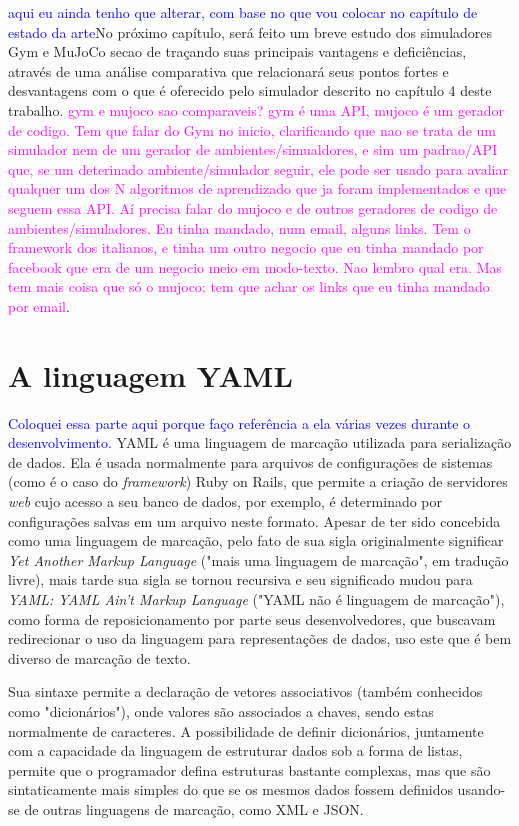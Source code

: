 \documentclass[cic,tc]{iiufrgs}
\newcommand\bruno[1]{\textcolor{magenta}{#1}}
\newcommand\henrique[1]{\textcolor{blue}{#1}}
\begin{document}
    
    \henrique{aqui eu ainda tenho que alterar, com base no que vou colocar no capítulo de estado da arte}No próximo capítulo, será feito um breve estudo dos simuladores Gym e MuJoCo secao de traçando suas principais vantagens e deficiências, através de uma
    análise comparativa que relacionará seus pontos fortes e desvantagens com o que é oferecido pelo simulador descrito no capítulo 4 deste trabalho. \bruno{gym e mujoco sao comparaveis? gym é uma API, mujoco é um gerador de codigo. Tem que falar do Gym no inicio, clarificando que nao se trata de um simulador nem de um gerador de ambientes/simualdores, e sim um padrao/API que, se um deterinado ambiente/simulador seguir, ele pode ser usado para avaliar qualquer um dos N algoritmos de aprendizado que ja foram implementados e que seguem essa API. Aí precisa falar do mujoco e de outros geradores de codigo de ambientes/simuladores. Eu tinha mandado, num email, alguns links. Tem o framework dos italianos, e tinha um outro negocio que eu tinha mandado por facebook que era de um negocio meio em modo-texto. Nao lembro qual era. Mas tem mais coisa que só o mujoco; tem que achar os links que eu tinha mandado por email}.
    
    \section{A linguagem YAML}
    \label{alinguagemyaml}
    \henrique{Coloquei essa parte aqui porque faço referência a ela várias vezes durante o desenvolvimento.}
    YAML é uma linguagem de marcação utilizada para serialização de dados. Ela é usada normalmente para arquivos de configurações de sistemas (como é o caso do \textit{framework})
    Ruby on Rails, que permite a criação de servidores \textit{web} cujo acesso a seu banco de dados, por exemplo, é determinado por configurações salvas em um arquivo neste formato.
    Apesar de ter sido concebida como uma linguagem de marcação, pelo fato de sua sigla originalmente significar \textit{Yet Another Markup Language} ("mais uma linguagem de marcação", em tradução livre),
    mais tarde sua sigla se tornou recursiva e seu significado mudou para \textit{YAML: YAML Ain't Markup Language} ("YAML não é linguagem de marcação"),
    como forma de reposicionamento por parte seus desenvolvedores, que buscavam redirecionar o uso da linguagem para representações de dados, uso este que é
    bem diverso de marcação de texto. \par
    Sua sintaxe permite a declaração de vetores associativos (também conhecidos como "dicionários"), onde valores são associados a chaves, sendo estas normalmente
     de caracteres.
    A possibilidade de definir dicionários, juntamente com a capacidade da linguagem de estruturar dados sob a forma de listas, permite que o programador defina
    estruturas bastante complexas, mas que são sintaticamente mais simples do que se os mesmos dados fossem definidos usando-se de outras linguagens de marcação, como XML e JSON.
    
\end{document}
